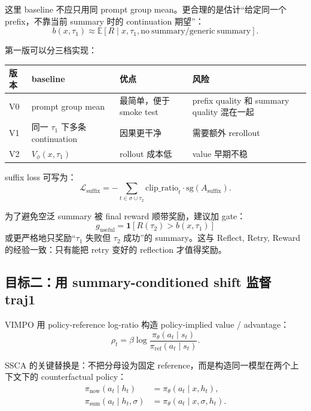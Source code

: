 \documentclass[10pt]{ctexart}
\begin{document}
这里 baseline 不应只用同 prompt group mean。更合理的是估计“给定同一个 prefix，不靠当前 summary 时的 continuation 期望”：
\begin{equation}
  b(x,\tau_1) \approx \mathbb{E}[R\mid x,\tau_1,\mathrm{no\ summary/generic\ summary}].
\end{equation}

第一版可以分三档实现：
\begin{center}
\begin{tabularx}{\linewidth}{lllX}
\toprule
版本 & baseline & 优点 & 风险 \\
\midrule
V0 & prompt group mean & 最简单，便于 smoke test & prefix quality 和 summary quality 混在一起 \\
V1 & 同一 $\tau_1$ 下多条 continuation & 因果更干净 & 需要额外 rerollout \\
V2 & $V_\phi(x,\tau_1)$ & rollout 成本低 & value 早期不稳 \\
\bottomrule
\end{tabularx}
\end{center}

suffix loss 可写为：
\begin{equation}
  \mathcal{L}_{\mathrm{suffix}}
  = - \sum_{t\in\sigma\cup\tau_2}
      \mathrm{clip\_ratio}_t\cdot \mathrm{sg}(A_{\mathrm{suffix}}).
\end{equation}

为了避免空泛 summary 被 final reward 顺带奖励，建议加 gate：
\begin{equation}
  g_{\mathrm{useful}}=\mathbf{1}[R(\tau_2)>b(x,\tau_1)]
\end{equation}
或更严格地只奖励“$\tau_1$ 失败但 $\tau_2$ 成功”的 summary。这与 Reflect, Retry, Reward 的经验一致：只有能把 retry 变好的 reflection 才值得奖励。

\subsection{目标二：用 summary-conditioned shift 监督 traj1}
VIMPO 用 policy-reference log-ratio 构造 policy-implied value / advantage：
\begin{equation}
  \rho_t = \beta \log\frac{\pi_\theta(a_t\mid s_t)}{\pi_{\mathrm{ref}}(a_t\mid s_t)}.
\end{equation}

SSCA 的关键替换是：不把分母设为固定 reference，而是构造同一模型在两个上下文下的 counterfactual policy：
\begin{align}
  \pi_{\mathrm{now}}(a_t\mid h_t) &= \pi_\theta(a_t\mid x,h_t),\\
  \pi_{\mathrm{sum}}(a_t\mid h_t,\sigma) &= \pi_\theta(a_t\mid x,\sigma,h_t).
\end{align}
\end{document}
